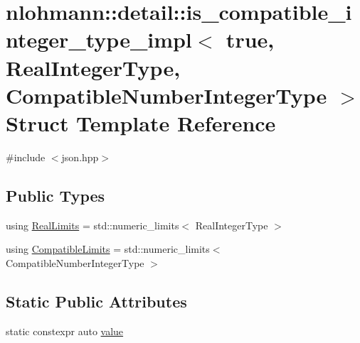 \hypertarget{structnlohmann_1_1detail_1_1is__compatible__integer__type__impl_3_01true_00_01_real_integer_type78b0ba77f36a8c8169cdb79b01d1a4bf}{}\section{nlohmann\+::detail\+::is\+\_\+compatible\+\_\+integer\+\_\+type\+\_\+impl$<$ true, Real\+Integer\+Type, Compatible\+Number\+Integer\+Type $>$ Struct Template Reference}
\label{structnlohmann_1_1detail_1_1is__compatible__integer__type__impl_3_01true_00_01_real_integer_type78b0ba77f36a8c8169cdb79b01d1a4bf}


{\ttfamily \#include $<$json.\+hpp$>$}

\subsection*{Public Types}
\begin{DoxyCompactItemize}
\item 
using \mbox{\hyperlink{structnlohmann_1_1detail_1_1is__compatible__integer__type__impl_3_01true_00_01_real_integer_type78b0ba77f36a8c8169cdb79b01d1a4bf_a1bad172320cd124997a3d68990f50a75}{Real\+Limits}} = std\+::numeric\+\_\+limits$<$ Real\+Integer\+Type $>$
\item 
using \mbox{\hyperlink{structnlohmann_1_1detail_1_1is__compatible__integer__type__impl_3_01true_00_01_real_integer_type78b0ba77f36a8c8169cdb79b01d1a4bf_a3bf8ee2f76e74f997258c9ba40c64bc4}{Compatible\+Limits}} = std\+::numeric\+\_\+limits$<$ Compatible\+Number\+Integer\+Type $>$
\end{DoxyCompactItemize}
\subsection*{Static Public Attributes}
\begin{DoxyCompactItemize}
\item 
static constexpr auto \mbox{\hyperlink{structnlohmann_1_1detail_1_1is__compatible__integer__type__impl_3_01true_00_01_real_integer_type78b0ba77f36a8c8169cdb79b01d1a4bf_a4c27142452b43418b1d5c0aad01bff50}{value}}
\end{DoxyCompactItemize}


